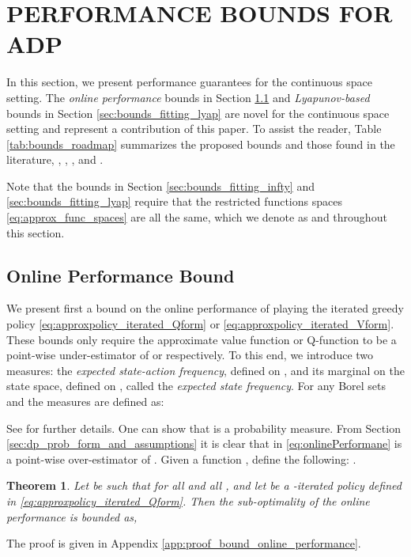 \documentclass[journal]{IEEEtran}
\newtheorem{theorem}{Theorem}[section]
\newcommand{\textQ}{Q}
\begin{document}
\section{PERFORMANCE BOUNDS FOR ADP} \label{sec:bounds}

In this section, we present performance guarantees for the continuous space setting. The \emph{online performance} bounds in Section \ref{sec:bounds_online} and \emph{Lyapunov-based} bounds in Section \ref{sec:bounds_fitting_lyap} are novel for the continuous space setting and represent a contribution of this paper.
To assist the reader, Table \ref{tab:bounds_roadmap} summarizes the proposed bounds and those found in the literature, \cite{vanRoy_linApproxDP}, \cite{vanroy_decentADP}, \cite{beuchat_2016_ECC_PWMQ}, and \cite{boyd_iteratedBellman}.


Note that the bounds in Section \ref{sec:bounds_fitting_infty} and \ref{sec:bounds_fitting_lyap} require that the restricted functions spaces \eqref{eq:approx_func_spaces} are all the same, which we denote as  and  throughout this section.




\subsection{Online Performance Bound}  \label{sec:bounds_online}

We present first a bound on the online performance of playing the iterated greedy policy \eqref{eq:approxpolicy_iterated_Qform} or \eqref{eq:approxpolicy_iterated_Vform}.
These bounds only require the approximate value function or \textQ-function to be a point-wise under-estimator of  or  respectively.
To this end, we introduce two measures: the \emph{expected state-action frequency},  defined on , and its marginal on the state space,  defined on , called the \emph{expected state frequency}. For any Borel sets  and  the measures are defined as:
	
See \cite[6.3.6]{hernandez_2012_discreteTimeMCP} for further details.
One can show that  is a probability measure.
From Section \ref{sec:dp_prob_form_and_assumptions} it is clear that  in \eqref{eq:onlinePerformane} is a point-wise over-estimator of .
Given a function , define the following: .



\vspace{0.2cm}

\begin{theorem} \label{theorem:online_performance_bound_iterated_Qform}
	Let  be such that  for all  and all , and let  be a -iterated policy defined in \eqref{eq:approxpolicy_iterated_Qform}. Then the sub-optimality of the online performance is bounded as,
	
\end{theorem}
\vspace{0.1cm}
The proof is given in Appendix \ref{app:proof_bound_online_performance}.
\end{document}
